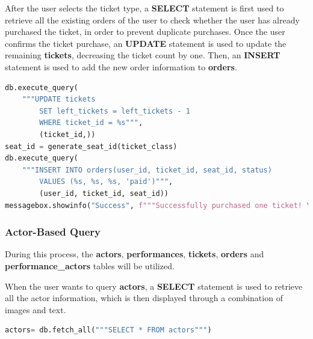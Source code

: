 \documentclass[12pt]{article}
\begin{document}
\par After the user selects the ticket type, a \textbf{SELECT} statement is first used to retrieve all the existing orders of the user to check whether the user has already purchased the ticket, in order to prevent duplicate purchases. Once the user confirms the ticket purchase, an \textbf{UPDATE} statement is used to update the remaining \textbf{tickets}, decreasing the ticket count by one. Then, an \textbf{INSERT} statement is used to add the new order information to \textbf{orders}.
\begin{tcolorbox}[colframe=black, colback=white, boxrule=0.4mm, sharp corners=southwest, title=Excerpt of Buy Ticket Code]
    \begin{lstlisting}[language=Python, breaklines=true]
db.execute_query(
    """UPDATE tickets
        SET left_tickets = left_tickets - 1
        WHERE ticket_id = %s""",
        (ticket_id,))
seat_id = generate_seat_id(ticket_class)
db.execute_query(
    """INSERT INTO orders(user_id, ticket_id, seat_id, status)
        VALUES (%s, %s, %s, 'paid')""",
        (user_id, ticket_id, seat_id))
messagebox.showinfo("Success", f"""Successfully purchased one ticket! \nYour seat ID is {seat_id}\nYou can check your order in the <My Orders> page.""")
\end{lstlisting}
\end{tcolorbox}

\subsubsection{Actor-Based Query}
\par During this process, the \textbf{actors}, \textbf{performances}, \textbf{tickets}, \textbf{orders} and \textbf{performance\_actors} tables will be utilized. 
\par When the user wants to query \textbf{actors}, a \textbf{SELECT} statement is used to retrieve all the actor information, which is then displayed through a combination of images and text.
\begin{tcolorbox}[colframe=black, colback=white, boxrule=0.4mm, sharp corners=southwest, title=Excerpt of Search Actors Code]
    \begin{lstlisting}[language=Python, breaklines=true]
actors= db.fetch_all("""SELECT * FROM actors""")
\end{lstlisting}
\end{tcolorbox}
\end{document}
